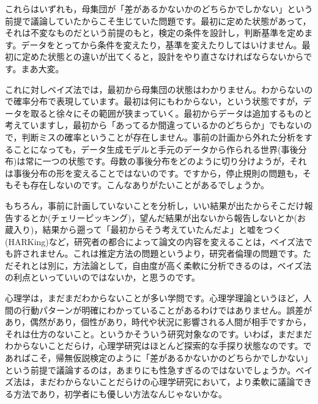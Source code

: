 \documentclass{ltjbook}
\begin{document}
これらはいずれも，母集団が「差があるかないかのどちらかでしかない」という前提で議論していたからこそ生じていた問題です。最初に定めた状態があって，それは不変なものだという前提のもと，検定の条件を設計し，判断基準を定めます。データをとってから条件を変えたり，基準を変えたりしてはいけません。最初に定めた状態との違いが出てくると，設計をやり直さなければならないからです。まあ大変。

これに対しベイズ法では，最初から母集団の状態はわかりません。わからないので確率分布で表現しています。最初は何にもわからない，という状態ですが，データを取ると徐々にその範囲が狭まっていく。最初からデータは追加するものと考えていますし，最初から「あってるか間違っているかのどちらか」でもないので，判断ミスの確率ということが存在しません。事前の計画から外れた分析をすることになっても，データ生成モデルと手元のデータから作られる世界(事後分布)は常に一つの状態です。母数の事後分布をどのように切り分けようが，それは事後分布の形を変えることではないのです。ですから，停止規則の問題も，そもそも存在しないのです。こんなありがたいことがあるでしょうか。

もちろん，事前に計画していないことを分析し，いい結果が出たからそこだけ報告するとか(チェリーピッキング)，望んだ結果が出ないから報告しないとか(お蔵入り)，結果から遡って「最初からそう考えていたんだよ」と嘘をつく(HARKing)など，研究者の都合によって論文の内容を変えることは，ベイズ法でも許されません。これは推定方法の問題というより，研究者倫理の問題です。ただそれとは別に，方法論として，自由度が高く柔軟に分析できるのは，ベイズ法の利点といっていいのではないか，と思うのです。


心理学は，まだまだわからないことが多い学問です。心理学理論というほど，人間の行動パターンが明確にわかっていることがあるわけではありません。誤差があり，偶然があり，個性があり，時代や状況に影響される人間が相手ですから，それは仕方のないこと。というかそういう研究対象なのです。いわば，まだまだわからないことだらけ，心理学研究はほとんど探索的な手探り状態なのです。であればこそ，帰無仮説検定のように「差があるかないかのどちらかでしかない」という前提で議論するのは，あまりにも性急すぎるのではないでしょうか。ベイズ法は，まだわからないことだらけの心理学研究において，より柔軟に議論できる方法であり，初学者にも優しい方法なんじゃないかな。




\end{document}

